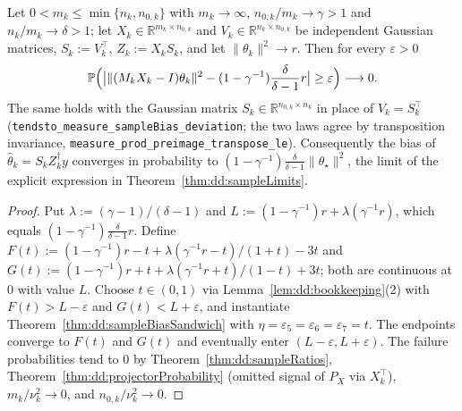 \begin{theorem}\label{thm:dd:sampleBiasProb}
  \leanok
Let $0<m_k\le\min\{n_k,n_{0,k}\}$ with $m_k\to\infty$, $n_{0,k}/m_k\to\gamma>1$ and $n_k/m_k\to\delta>1$; let $X_k\in\mathbb R^{m_k\times n_{0,k}}$ and $V_k\in\mathbb R^{n_k\times n_{0,k}}$ be independent Gaussian matrices, $S_k:=V_k^\top$, $Z_k:=X_kS_k$, and let $\|\theta_k\|^2\to r$. Then for every $\varepsilon>0$
\[
  \mathbb P\Bigl(\bigl|\|(M_kX_k-I)\theta_k\|^2-(1-\gamma^{-1})\frac{\delta}{\delta-1}r\bigr|\ge\varepsilon\Bigr)\longrightarrow0 .
\]
The same holds with the Gaussian matrix $S_k\in\mathbb R^{n_{0,k}\times n_k}$ in place of $V_k=S_k^\top$ (\texttt{tendsto\_measure\_sampleBias\_deviation}; the two laws agree by transposition invariance, \texttt{measure\_prod\_preimage\_transpose\_le}). Consequently the bias of $\hat\theta_k=S_kZ_k^\dagger y$ converges in probability to $(1-\gamma^{-1})\frac{\delta}{\delta-1}\|\theta_\star\|^2$, the limit of the explicit expression in Theorem~\ref{thm:dd:sampleLimits}.
\end{theorem}

\begin{proof}
  \leanok
Put $\lambda:=(\gamma-1)/(\delta-1)$ and $L:=(1-\gamma^{-1})r+\lambda(\gamma^{-1}r)$, which equals $(1-\gamma^{-1})\frac{\delta}{\delta-1}r$. Define $F(t):=(1-\gamma^{-1})r-t+\lambda(\gamma^{-1}r-t)/(1+t)-3t$ and $G(t):=(1-\gamma^{-1})r+t+\lambda(\gamma^{-1}r+t)/(1-t)+3t$; both are continuous at $0$ with value $L$. Choose $t\in(0,1)$ via Lemma~\ref{lem:dd:bookkeeping}(2) with $F(t)>L-\varepsilon$ and $G(t)<L+\varepsilon$, and instantiate Theorem~\ref{thm:dd:sampleBiasSandwich} with $\eta=\varepsilon_5=\varepsilon_6=\varepsilon_7=t$. The endpoints converge to $F(t)$ and $G(t)$ and eventually enter $(L-\varepsilon,L+\varepsilon)$. The failure probabilities tend to $0$ by Theorem~\ref{thm:dd:sampleRatios}, Theorem~\ref{thm:dd:projectorProbability} (omitted signal of $P_X$ via $X_k^\top$), $m_k/\nu_k^2\to0$, and $n_{0,k}/\nu_k^2\to0$.
\end{proof}

